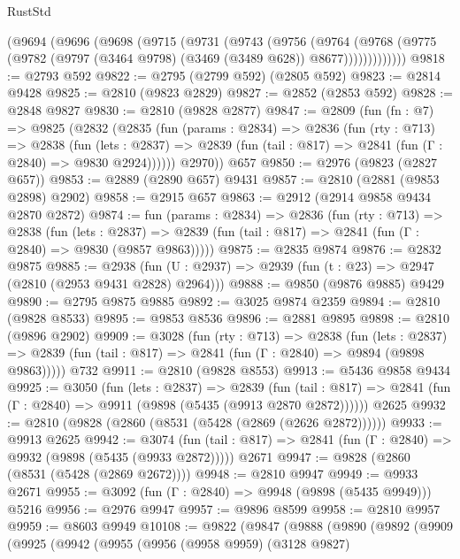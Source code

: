 \begin{lexlean}{RustStd}
\begin{coremodule}
      (@9694
        (@9696
          (@9698
            (@9715
              (@9731
                (@9743
                  (@9756
                    (@9764
                      (@9768
                        (@9775 (@9782 (@9797 (@3464 @9798) (@3469 (@3489 @628)) @8677)))))))))))))
@9818 := @2793 @592
@9822 := @2795 (@2799 @592) (@2805 @592)
@9823 := @2814 @9428
@9825 := @2810 (@9823 @2829)
@9827 := @2852 (@2853 @592)
@9828 := @2848 @9827
@9830 := @2810 (@9828 @2877)
@9847 := @2809
    (fun (fn : @7) =>
    @9825
      (@2832
        (@2835
          (fun (params : @2834) =>
          @2836
            (fun (rty : @713) =>
            @2838
              (fun (lets : @2837) =>
              @2839 (fun (tail : @817) => @2841 (fun (Γ : @2840) => @9830 @2924))))))
        @2970))
    @657
@9850 := @2976 (@9823 (@2827 @657))
@9853 := @2889 (@2890 @657) @9431
@9857 := @2810 (@2881 (@9853 @2898) @2902)
@9858 := @2915 @657
@9863 := @2912 (@2914 @9858 @9434 @2870 @2872)
@9874 := fun (params : @2834) =>
  @2836
    (fun (rty : @713) =>
    @2838
      (fun (lets : @2837) =>
      @2839 (fun (tail : @817) => @2841 (fun (Γ : @2840) => @9830 (@9857 @9863)))))
@9875 := @2835 @9874
@9876 := @2832 @9875
@9885 := @2938 (fun (U : @2937) => @2939 (fun (t : @23) => @2947 (@2810 (@2953 @9431 @2828) @2964)))
@9888 := @9850 (@9876 @9885) @9429
@9890 := @2795 @9875 @9885
@9892 := @3025 @9874 @2359
@9894 := @2810 (@9828 @8533)
@9895 := @9853 @8536
@9896 := @2881 @9895
@9898 := @2810 (@9896 @2902)
@9909 := @3028
    (fun (rty : @713) =>
    @2838
      (fun (lets : @2837) =>
      @2839 (fun (tail : @817) => @2841 (fun (Γ : @2840) => @9894 (@9898 @9863)))))
    @732
@9911 := @2810 (@9828 @8553)
@9913 := @5436 @9858 @9434
@9925 := @3050
    (fun (lets : @2837) =>
    @2839
      (fun (tail : @817) => @2841 (fun (Γ : @2840) => @9911 (@9898 (@5435 (@9913 @2870 @2872))))))
    @2625
@9932 := @2810 (@9828 (@2860 (@8531 (@5428 (@2869 (@2626 @2872))))))
@9933 := @9913 @2625
@9942 := @3074
    (fun (tail : @817) => @2841 (fun (Γ : @2840) => @9932 (@9898 (@5435 (@9933 @2872)))))
    @2671
@9947 := @9828 (@2860 (@8531 (@5428 (@2869 @2672))))
@9948 := @2810 @9947
@9949 := @9933 @2671
@9955 := @3092 (fun (Γ : @2840) => @9948 (@9898 (@5435 @9949))) @5216
@9956 := @2976 @9947
@9957 := @9896 @8599
@9958 := @2810 @9957
@9959 := @8603 @9949
@10108 := @9822
    (@9847
      (@9888
        (@9890
          (@9892
            (@9909
              (@9925
                (@9942
                  (@9955
                    (@9956
                      (@9958 @9959)
                      (@3128 @9827)

\end{coremodule}
\end{lexlean}
